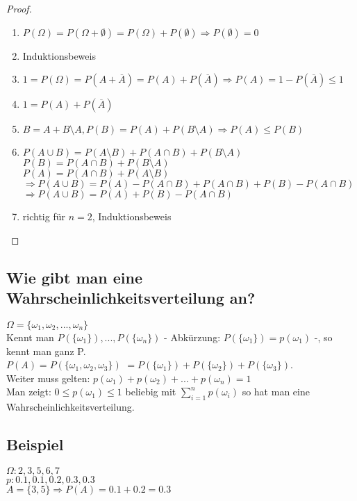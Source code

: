 \begin{proof}
\begin{enumerate}
\item $ P(\Omega)= P(\Omega + \emptyset) = P(\Omega) + P(\emptyset) \Rightarrow P(\emptyset) = 0 $ 
\item Induktionsbeweis 
\item $ 1 = P(\Omega) = P(A + \overline{A})= P(A) + P(\overline{A}) \Rightarrow P(A) = 1 - P(\overline{A}) \leq 1 $ 
\item $ 1= P(A) + P(\overline{A}) $ 
\item $ B=A+B \setminus A, P(B)=P(A) + P(B\setminus A) \Rightarrow P(A) \leq P(B) $ 
\item $ P(A\cup B)= P(A\setminus B) + P(A\cap B) + P(B\setminus A) $\\
	$ P(B) = P(A\cap B) + P(B\setminus A) $ \\
	$ P(A) = P(A\cap B) + P(A\setminus B) $\\
	$ \Rightarrow P(A\cup B) = P(A) - P(A\cap B) + P(A\cap B) + P(B) - P(A\cap B) $
	$ \Rightarrow P(A\cup B) = P(A) + P(B) - P(A\cap B) $
\item richtig für $ n=2 $, Induktionsbeweis 
\end{enumerate}
\end{proof}

\subsection{Wie gibt man eine Wahrscheinlichkeitsverteilung an?}
$\Omega = \{ \omega_1, \omega_2, ..., \omega_n \} $\\
Kennt man $ P(\{\omega_1\}), ..., P(\{\omega_n\}) $ - Abkürzung: $ P(\{\omega_1\}) = p(\omega_1) $ -, so kennt man ganz P. \\
$ P(A) = P(\{ \omega_1, \omega_2, \omega_3 \}) $ $= P(\{\omega_1\}) + P(\{\omega_2\}) + P(\{\omega_3\})$.\\
Weiter muss gelten: $ p(\omega_1) + p(\omega_2) + ... + p(\omega_n) = 1 $\\
Man zeigt: $ 0\leq p(\omega_1) \leq 1 $ beliebig mit $ \sum_{i=1}^{n} p(\omega_i) $ so hat man eine Wahrscheinlichkeitsverteilung. 

\subsection{Beispiel}
$ \Omega: 2,3,5,6,7 $\\
$ p: 0.1, 0.1, 0.2, 0.3, 0.3 $\\
$ A = \{ 3,5 \} \Rightarrow P(A) = 0.1 + 0.2 = 0.3 $

